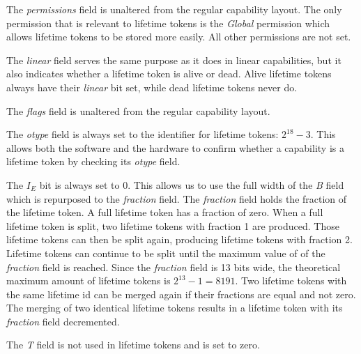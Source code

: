 The \textit{permissions} field is unaltered from the regular capability layout. The only permission that is relevant to lifetime tokens is the \textit{Global} permission which allows lifetime tokens to be stored more easily. All other permissions are not set.

The \textit{linear} field serves the same purpose as it does in linear capabilities, but it also indicates whether a lifetime token is alive or dead. Alive lifetime tokens always have their \textit{linear} bit set, while dead lifetime tokens never do.

The \textit{flags} field is unaltered from the regular capability layout.

The \textit{otype} field is always set to the identifier for lifetime tokens: $2^{18} - 3$. This allows both the software and the hardware to confirm whether a capability is a lifetime token by checking its \textit{otype} field.

The $I_E$ bit is always set to 0. This allows us to use the full width of the \textit{B} field which is repurposed to the \textit{fraction} field. The \textit{fraction} field holds the fraction of the lifetime token. A full lifetime token has a fraction of zero. When a full lifetime token is split, two lifetime tokens with fraction 1 are produced. Those lifetime tokens can then be split again, producing lifetime tokens with fraction 2. Lifetime tokens can continue to be split until the maximum value of of the \textit{fraction} field is reached. Since the \textit{fraction} field is 13 bits wide, the theoretical maximum amount of lifetime tokens is $2^{13} - 1=8191$. Two lifetime tokens with the same lifetime id can be merged again if their fractions are equal and not zero. The merging of two identical lifetime tokens results in a lifetime token with its \textit{fraction} field decremented.

The \textit{T} field is not used in lifetime tokens and is set to zero.

